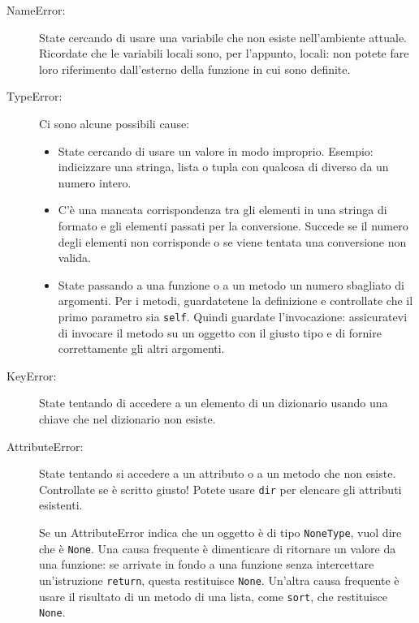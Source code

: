 \documentclass[10pt]{book}
\begin{document}
\begin{description}

\item[NameError:]  State cercando di usare una variabile che non esiste nell'ambiente attuale. Ricordate che le variabili locali sono, per l'appunto, locali: non potete fare loro riferimento dall'esterno della funzione in cui sono definite.

\item[TypeError:] Ci sono alcune possibili cause:

\begin{itemize}

\item  State cercando di usare un valore in modo improprio. Esempio: indicizzare una stringa, lista o tupla con qualcosa di diverso da un numero intero. 

\item C'è una mancata corrispondenza tra gli elementi in una stringa di formato e gli elementi passati per la conversione. Succede se il numero degli elementi non corrisponde o se viene tentata una conversione non valida.

\item State passando a una funzione o a un metodo un numero sbagliato di argomenti. Per i metodi, guardatetene la definizione e controllate che il primo parametro sia {\tt self}.  Quindi guardate l'invocazione: assicuratevi di invocare il metodo su un oggetto con il giusto tipo e di fornire correttamente gli altri argomenti.

\end{itemize}

\item[KeyError:]  State tentando di accedere a un elemento di un dizionario usando una chiave che nel dizionario non esiste.

\item[AttributeError:] State tentando si accedere a un attributo o a un metodo che non esiste. Controllate se è scritto giusto! Potete usare
{\tt dir} per elencare gli attributi esistenti.

Se un AttributeError indica che un oggetto è di tipo {\tt NoneType},
vuol dire che è {\tt None}.  Una causa frequente è dimenticare di ritornare un valore da una funzione: se arrivate in fondo a una funzione senza intercettare un'istruzione {\tt return}, questa restituisce {\tt None}.  Un'altra causa frequente è usare il risultato di un metodo di una lista, come {\tt sort}, che restituisce {\tt None}.


\end{description}
\end{document}
